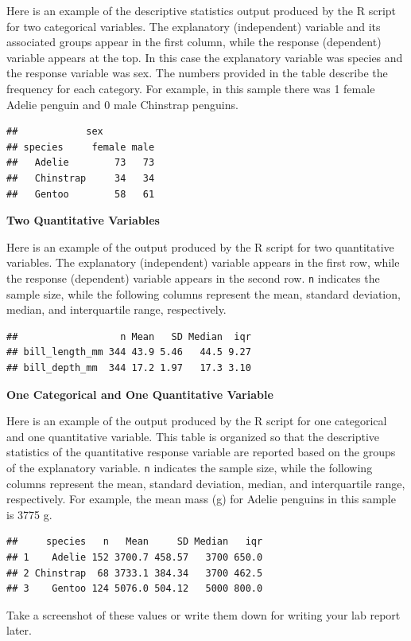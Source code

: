 \documentclass[
]{book}
\begin{document}
Here is an example of the descriptive statistics output produced by the R script for two categorical variables. The explanatory (independent) variable and its associated groups appear in the first column, while the response (dependent) variable appears at the top. In this case the explanatory variable was species and the response variable was sex. The numbers provided in the table describe the frequency for each category. For example, in this sample there was 1 female Adelie penguin and 0 male Chinstrap penguins.

\begin{verbatim}
##            sex
## species     female male
##   Adelie        73   73
##   Chinstrap     34   34
##   Gentoo        58   61
\end{verbatim}

\textbf{Two Quantitative Variables}

Here is an example of the output produced by the R script for two quantitative variables. The explanatory (independent) variable appears in the first row, while the response (dependent) variable appears in the second row. \texttt{n} indicates the sample size, while the following columns represent the mean, standard deviation, median, and interquartile range, respectively.

\begin{verbatim}
##                  n Mean   SD Median  iqr
## bill_length_mm 344 43.9 5.46   44.5 9.27
## bill_depth_mm  344 17.2 1.97   17.3 3.10
\end{verbatim}

\textbf{One Categorical and One Quantitative Variable}

Here is an example of the output produced by the R script for one categorical and one quantitative variable. This table is organized so that the descriptive statistics of the quantitative response variable are reported based on the groups of the explanatory variable. \texttt{n} indicates the sample size, while the following columns represent the mean, standard deviation, median, and interquartile range, respectively. For example, the mean mass (g) for Adelie penguins in this sample is 3775 g.

\begin{verbatim}
##     species   n   Mean     SD Median   iqr
## 1    Adelie 152 3700.7 458.57   3700 650.0
## 2 Chinstrap  68 3733.1 384.34   3700 462.5
## 3    Gentoo 124 5076.0 504.12   5000 800.0
\end{verbatim}

Take a screenshot of these values or write them down for writing your lab report later.
\end{document}
